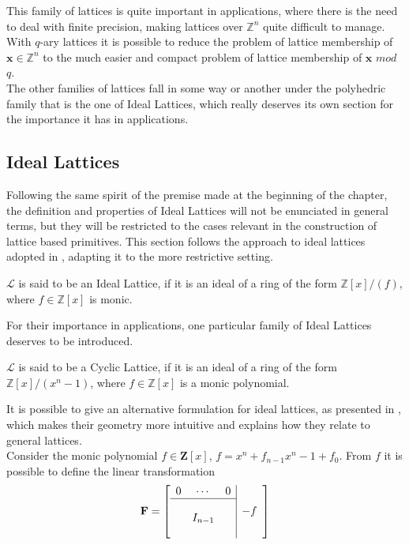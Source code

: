 This family of lattices is quite important in applications, where there is the need to deal with finite precision, making lattices over $\mathbb{Z}^n$ quite difficult to manage. With $q$-ary lattices it is possible to reduce the problem of lattice membership of $\mathbf{x}\in\mathbb{Z}^n$ to the much easier and compact problem of lattice membership of $\mathbf{x}$ $mod$ $q$.\\
The other families of lattices fall in some way or another under the polyhedric family that is the one of Ideal Lattices, which really deserves its own section for the importance it has in applications.

\subsection{Ideal Lattices}\label{sec:bg:ideal}

Following the same spirit of the premise made at the beginning of the chapter, the definition and properties of Ideal Lattices will not be enunciated in general terms, but they will be restricted to the cases relevant in the construction of lattice based primitives. This section follows the approach to ideal lattices adopted in \cite{ideal_lattices}, adapting it to the more restrictive setting.

\begin{definition}
$\mathscr{L}$ is said to be an Ideal Lattice, if it is an ideal of a ring of the form $\mathbb{Z}[x]/(f)$, where $f\in\mathbb{Z}[x]$ is monic.\\
\end{definition}

For their importance in applications, one particular family of Ideal Lattices deserves to be introduced.

\begin{definition}
$\mathscr{L}$ is said to be a Cyclic Lattice, if it is an ideal of a ring of the form $\mathbb{Z}[x]/(x^n-1)$, where $f\in\mathbb{Z}[x]$ is a monic polynomial.\\
\end{definition}

It is possible to give an alternative formulation for ideal lattices, as presented in \cite{PQC}, which makes their geometry more intuitive and explains how they relate to general lattices.\\
Consider the monic polynomial $f\in\mathbf{Z}[x]$, $f=x^n+f_{n-1}x^n-1 + f_0$. From $f$ it is possible to define the linear transformation
\begin{equation*}
\mathbf{F}=
\left[\begin{array}{ccc|c}
0&\cdots&0&\multirow{4}{*}{$-f$}\\
\cline{1-3}
&&&\\
&I_{n-1}&&\\
&&&
\end{array}\right]
\end{equation*}

